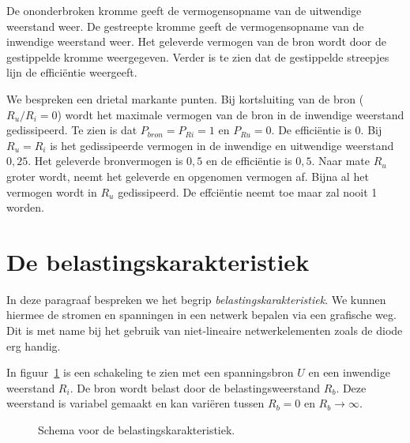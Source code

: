 De ononderbroken kromme geeft de vermogensopname van de uitwendige weerstand weer. De gestreepte
kromme geeft de vermogensopname van de inwendige weerstand weer. Het geleverde vermogen van de
bron wordt door de gestippelde kromme weergegeven. Verder is te zien dat de gestippelde
streepjes lijn de effici\"entie weergeeft.

We bespreken een drietal markante punten.
Bij kortsluiting van de bron ($R_u/R_i=0$) wordt het maximale vermogen van de bron in de inwendige
weerstand gedissipeerd. Te zien is dat $P_{bron} = P_{Ri} = 1$ en $P_{Ru} = 0$. De effici\"entie is 0.
Bij $R_u=R_i$ is het gedissipeerde vermogen in de inwendige en uitwendige weerstand $0,25$. Het geleverde
bronvermogen is $0,5$ en de effici\"entie is $0,5$. Naar mate $R_u$ groter wordt, neemt het geleverde
en opgenomen vermogen af. Bijna al het vermogen wordt in $R_u$ gedissipeerd. De effci\"entie neemt toe
maar zal nooit 1 worden.


\section{De belastingskarakteristiek}
\label{sec:belastingskarakteristiek}
In deze paragraaf bespreken we het begrip \textsl{belastingskarakteristiek}. We kunnen hiermee de stromen
en spanningen in een netwerk bepalen via een grafische weg. Dit is met name bij het gebruik van niet-lineaire
netwerkelementen zoals de diode erg handig.

In figuur~\ref{fig:gelschemavoorbelastingskarakteristiek} is een schakeling te zien met een spanningsbron
$U$ en een inwendige weerstand $R_i$. De bron wordt belast door de belastingsweerstand $R_b$. Deze weerstand
is variabel gemaakt en kan vari\"eren tussen $R_b = 0$ en $R_b \rightarrow \infty$.

\begin{figure}[!ht]
\centering
{}
\captionsetup{width=.9\linewidth}
\caption{Schema voor de belastingskarakteristiek.}
\label{fig:gelschemavoorbelastingskarakteristiek}
\end{figure}

